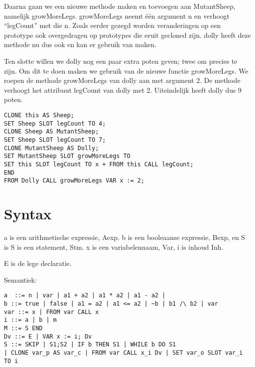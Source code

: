\documentclass[12pt]{article}
\begin{document}
Daarna gaan we een nieuwe methode maken en toevoegen aan MutantSheep, namelijk growMoreLegs.
growMoreLegs neemt \'e\'en argument n en verhoogt ``legCount'' met die n. Zoals eerder gezegd worden veranderingen op een prototype ook overgedragen op prototypes die eruit gecloned zijn. dolly heeft deze methode nu dus ook en kan er gebruik van maken.\newline

Ten slotte willen we dolly nog een paar extra poten geven; twee om precies te zijn.
Om dit te doen maken we gebruik van de nieuwe functie growMoreLegs.
We roepen de methode growMoreLegs van dolly aan met argument 2.
De methode verhoogt het attribuut legCount van dolly met 2.
Uiteindelijk heeft dolly dus 9 poten.

\begin{lstlisting}[frame=single]
CLONE this AS Sheep;
SET Sheep SLOT legCount TO 4;
CLONE Sheep AS MutantSheep;
SET Sheep SLOT legCount TO 7;
CLONE MutantSheep AS Dolly;
SET MutantSheep SLOT growMoreLegs TO
SET this SLOT legCount TO x + FROM this CALL legCount;
END
FROM Dolly CALL growMoreLegs VAR x := 2;
\end{lstlisting}

\pagebreak
\section{Syntax}

a is een arithmetische expressie, Aexp.
b is een booleaanse expressie, Bexp, en S is S is een statement, Stm.
x is een variabelennaam, Var,
i is inhoud Inh.

E is de lege declaratie.

Semantiek:

\begin{lstlisting}
a  ::= n | var | a1 + a2 | a1 * a2 | a1 - a2 |   
b ::= true | false | a1 = a2 | a1 <= a2 | ~b | b1 /\ b2 | var 
var ::= x | FROM var CALL x
i ::= a | b | m
M ::= S END 
Dv ::= E | VAR x := i; Dv
S ::= SKIP | S1;S2 | IF b THEN S1 | WHILE b DO S1
| CLONE var_p AS var_c | FROM var CALL x_i Dv | SET var_o SLOT var_i TO i

\end{lstlisting}

\pagebreak
\end{document}
